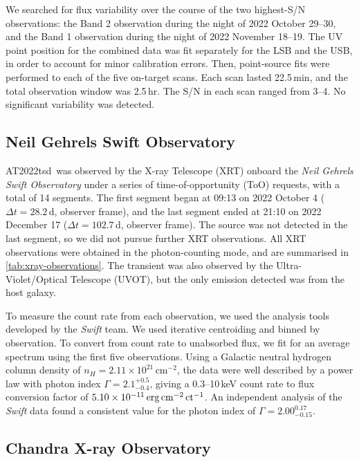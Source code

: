 \documentclass{nature_plusfigure}
\newcommand{\at}{AT2022tsd}
\begin{document}
\begin{methods}
We searched for flux variability over the course of the two highest-S/N observations: the Band 2 observation during the night of 2022 October 29--30, and the Band 1 observation during the night of 2022 November 18--19.
The UV point position for the combined data was fit separately for the LSB and the USB, in
order to account for minor calibration errors.
Then, point-source fits were performed to each of the five on-target scans. Each scan lasted 22.5\,min, and the total observation window was 2.5\,hr. The S/N in each scan ranged from 3--4. No significant variability was detected.

\subsection{Neil Gehrels Swift Observatory}
\label{sec:swift}

\at\ was observed by the X-ray Telescope (XRT\cite{Burrows2005}) onboard the {\it Neil Gehrels Swift Observatory} under a series of time-of-opportunity (ToO) requests, with a total of 14 segments. The first segment began at 09:13 on 2022 October 4 ($\Delta t=28.2\,$d, observer frame), and the last segment ended at 21:10 on 2022 December 17 ($\Delta t=102.7\,$d, observer frame). The source was not detected in the last segment, so we did not pursue further XRT observations.
All XRT observations were obtained in the photon-counting mode, and are summarised in \ref{tab:xray-observations}.
The transient was also observed by the Ultra-Violet/Optical Telescope (UVOT\cite{Roming2005}), but the only emission detected was from the host galaxy. 

To measure the count rate from each observation, we used the analysis tools developed by the {\it Swift} team\cite{Evans2007,Evans2009}.
We used iterative centroiding and binned by observation. 
To convert from count rate to unabsorbed flux, we fit for an average spectrum using the first five observations. Using a Galactic neutral hydrogen column density\cite{Willingale2013} of $n_H=2.11\times10^{21}\,$cm$^{-2}$, the data were well described by a power law with photon index $\Gamma=2.1^{+0.5}_{-0.4}$, 
giving a 0.3--10\,keV count rate to flux conversion factor of $5.10\times 10^{-11}\,\rm erg\,cm^{-2}\,ct^{-1}$.
An independent analysis of the {\it Swift} data\cite{Matthews2023} found a consistent value for the photon index of $\Gamma=2.00^{0.17}_{-0.15}$.

\subsection{Chandra X-ray Observatory}
\label{sec:chandra}


\end{methods}
\end{document}
